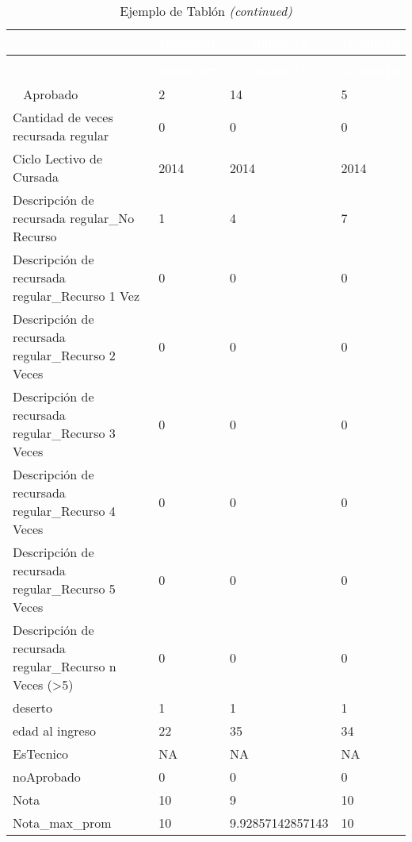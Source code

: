 \begingroup\fontsize{10}{12}\selectfont

\begin{longtable}[t]{llll}
\caption{\label{tab:tabla_tablon_baseline}Ejemplo de Tablón}\\
\toprule
\rowcolor{black}  \multicolumn{1}{c}{\textcolor{white}{\textbf{variable}}} & \multicolumn{1}{c}{\textcolor{white}{\textbf{10000007}}} & \multicolumn{1}{c}{\textcolor{white}{\textbf{10000015}}} & \multicolumn{1}{c}{\textcolor{white}{\textbf{10000016}}}\\
\midrule
\endfirsthead
\caption[]{Ejemplo de Tablón \textit{(continued)}}\\
\toprule
\rowcolor{black}  \multicolumn{1}{c}{\textcolor{white}{\textbf{variable}}} & \multicolumn{1}{c}{\textcolor{white}{\textbf{10000007}}} & \multicolumn{1}{c}{\textcolor{white}{\textbf{10000015}}} & \multicolumn{1}{c}{\textcolor{white}{\textbf{10000016}}}\\
\midrule
\endhead
\
\endfoot
\bottomrule
\endlastfoot
\rowcolor{gray!6}  Aprobado & 2 & 14 & 5\\
Cantidad de veces recursada regular & 0 & 0 & 0\\
\rowcolor{gray!6}  Ciclo Lectivo de Cursada & 2014 & 2014 & 2014\\
Descripción de recursada regular\_No Recurso & 1 & 4 & 7\\
\rowcolor{gray!6}  Descripción de recursada regular\_Recurso 1 Vez & 0 & 0 & 0\\
\addlinespace
Descripción de recursada regular\_Recurso 2 Veces & 0 & 0 & 0\\
\rowcolor{gray!6}  Descripción de recursada regular\_Recurso 3 Veces & 0 & 0 & 0\\
Descripción de recursada regular\_Recurso 4 Veces & 0 & 0 & 0\\
\rowcolor{gray!6}  Descripción de recursada regular\_Recurso 5 Veces & 0 & 0 & 0\\
Descripción de recursada regular\_Recurso n Veces (>5) & 0 & 0 & 0\\
\addlinespace
\rowcolor{gray!6}  deserto & 1 & 1 & 1\\
edad al ingreso & 22 & 35 & 34\\
\rowcolor{gray!6}  EsTecnico & NA & NA & NA\\
noAprobado & 0 & 0 & 0\\
\rowcolor{gray!6}  Nota & 10 & 9 & 10\\
\addlinespace
Nota\_max\_prom & 10 & 9.92857142857143 & 10\\

\end{longtable}
